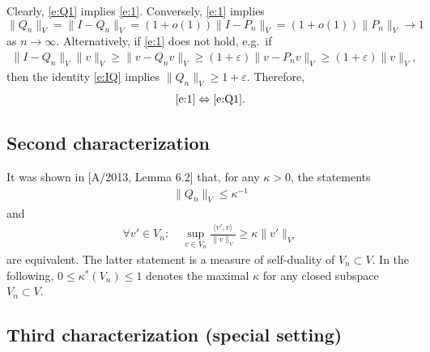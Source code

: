 \documentclass[12pt]{article}
\newcommand{\norm}[2]{\|#1\|_{#2}}
\newcommand{\scalar}[2]{\langle#1\rangle_{#2}}
\begin{document}
	
	Clearly, \eqref{e:Q1} implies \eqref{e:1}.
	Conversely, 
	\eqref{e:1} implies
	$
		\norm{Q_n}{V} = \norm{I - Q_n}{V}
		=
		(1 + o(1))
		\norm{I - P_n}{V}
		=
		(1 + o(1))
		\norm{P_n}{V}
		\to 1
	$
	as $n \to \infty$.
	Alternatively,
	if \eqref{e:1} does not hold,
	e.g.~if
	\begin{align}
		\norm{I - Q_n}{V} \norm{v}{V}
		\geq 
		\norm{v - Q_n v}{V} 
		\geq 
		(1 + \varepsilon) \norm{v - P_n v}{V}
		\geq 
		(1 + \varepsilon) \norm{v}{V}
		,
	\end{align}
	then
	the identity \eqref{e:IQ} implies
	$\norm{Q_n}{V} \geq 1 + \varepsilon$.
	Therefore, 
	\begin{align}
		\eqref{e:1}
		\Leftrightarrow
		\eqref{e:Q1}
		.
	\end{align}
	
	
	\subsection*{Second characterization}
	
	
	It was shown in [A/2013, Lemma 6.2] that,
	for any $\kappa > 0$,
	the statements
	\begin{align}
		\label{e:A-Qk}
		\norm{Q_n}{V} \leq \kappa^{-1}
	\end{align}
	and
	\begin{align}
		\label{e:A-Vk}
		\forall v' \in V_n:
		\quad
		\sup_{v \in V_n}
		\frac{
			\scalar{v', v}{}
		}{
			\norm{v}{V}
		}
		\geq
		\kappa
		\norm{v'}{V'} 
	\end{align}
	are equivalent.
	The latter statement is a measure of self-duality of $V_n \subset V$.
	In the following, $0 \leq \kappa^*(V_n) \leq 1$ denotes 
	the maximal $\kappa$
	for any closed subspace $V_n \subset V$.
	
	
	\subsection*{Third characterization (special setting)}
	
	
\end{document}
